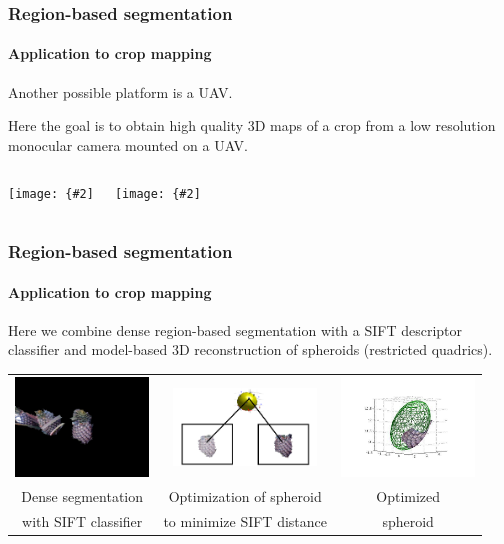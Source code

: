 \documentclass[aspectratio=169]{beamer}
\newcommand{\myfig}[3]{\centerline{\texttt{[image: \{\#2]}}}
\begin{document}
\begin{frame}
\frametitle{Region-based segmentation}
\framesubtitle{Application to crop mapping}

Another possible platform is a UAV.

\medskip

Here the goal is to obtain high quality 3D maps of a crop from a
low resolution monocular camera mounted on a UAV.

\medskip

\begin{columns}
\column{1.5in}
\myfig{1.5in}{figs/QuadCopter}{Quad-copter}
\column{1.5in}
\myfig{1.5in}{figs/image1249}{Image taken from quad-copter}
\end{columns}

\end{frame}


\begin{frame}
\frametitle{Region-based segmentation}
\framesubtitle{Application to crop mapping}

Here we combine dense region-based segmentation with a SIFT
descriptor classifier and model-based
3D reconstruction of spheroids (restricted quadrics).

\medskip

\begin{tabular}{ccc}
\includegraphics[width=1.4in]{figs/Waqar-DenseSeg} &
\includegraphics[width=1.5in]{figs/Waqar-Reconstruct} &
\includegraphics[width=1.4in]{figs/Waqar-Ellipsoid} \\
Dense segmentation & Optimization of spheroid & Optimized \\
with SIFT classifier & to minimize SIFT distance & spheroid
\end{tabular}

\end{frame}
\end{document}
